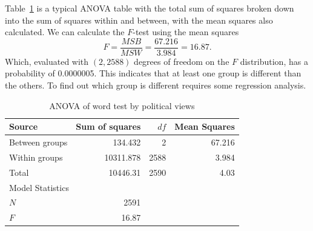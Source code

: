 Table~\ref{tab:wordanova} is a typical ANOVA table with the total sum of squares broken down into the sum of squares within and between, with the mean squares also calculated. We can calculate the $F$-test using the mean squares
\[
F=\frac{MSB}{MSW}=\frac{67.216}{3.984}=16.87.
\]
Which, evaluated with $\left(2,2588\right)$ degrees of freedom on the $F$ distribution, has a probability of 0.0000005. This indicates that at least one group is different than the others. To find out which group is different requires some regression analysis.

\begin{table}[htbp]\centering
 \caption{ANOVA of word test by political views
\label{tab:wordanova}}
\begin{tabular}{lrrr}
\hline
Source & Sum of squares & $df$ & Mean Squares \\
\hline
Between groups & 134.432 & 2 & 67.216 \\
Within groups & 10311.878 & 2588 & 3.984 \\
\hline
Total & 10446.31 & 2590 & 4.03 \\
\hline
\multicolumn{4}{l}{Model Statistics} \\
\hline
$N$      &   2591 & \\
$F$      &   16.87  \\
\hline
\end{tabular}
\end{table}


